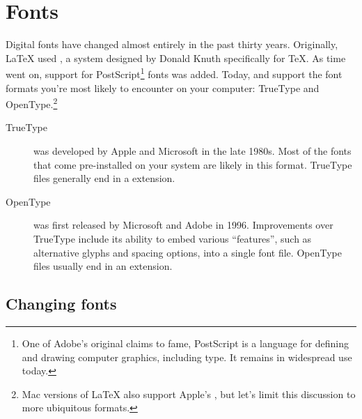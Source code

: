\chapter{Fonts}
\label{fonts}

Digital fonts have changed almost entirely in the past thirty years.
Originally, \LaTeX{} used \MF,
a system designed by Donald Knuth specifically for \TeX{}.
As time went on, support for PostScript\footnote{One of
Adobe's original claims to fame,
PostScript is a language for defining and drawing computer graphics,
including type. It remains in widespread use today.} fonts was added.
Today, \LuaLaTeX{} and \XeLaTeX{} support the font formats you're
most likely to encounter on your computer:
TrueType and OpenType.\punckern\footnote{Mac versions of \LaTeX{} also support
Apple's , but let's limit this discussion to
more ubiquitous formats.}

\begin{description}
\item[TrueType] was developed by Apple and Microsoft in the late 1980s.
    Most of the fonts that come pre-installed on your system are likely
    in this format.
    TrueType files generally end in a  extension.
\item[OpenType] was first released by Microsoft and Adobe in 1996.
    Improvements over TrueType include its ability to embed
    various ``features''\quotekern, such as alternative glyphs
    and spacing options, into a single font file.
    OpenType files usually end in an  extension.
\end{description}

\section{Changing fonts}

